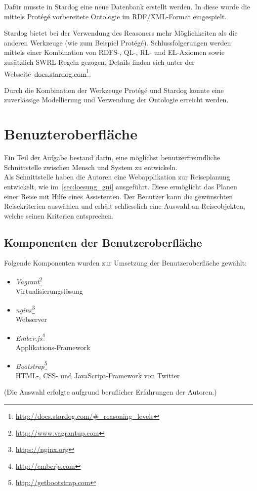 Dafür musste in Stardog eine neue Datenbank erstellt werden. In diese wurde die mittels Protégé vorbereitete Ontologie im RDF/XML-Format eingespielt.

Stardog bietet bei der Verwendung des Reasoners mehr Möglichkeiten als die anderen Werkzeuge (wie zum Beispiel Protégé). Schlussfolgerungen werden mittels einer Kombination von RDFS-, QL-, RL- und EL-Axiomen sowie zusätzlich SWRL-Regeln gezogen. Details finden sich unter der Webseite~\href{http://docs.stardog.com/\#_reasoning_levels}{docs.stardog.com}\footnote{\url{http://docs.stardog.com/\#_reasoning_levels}}.

Durch die Kombination der Werkzeuge Protégé und Stardog konnte eine zuverlässige Modellierung und Verwendung der Ontologie erreicht werden.

\section{Benuzteroberfläche}
\label{sec:komponenten:ember}
Ein Teil der Aufgabe bestand darin, eine möglichst benutzerfreundliche Schnittstelle zwischen Mensch und System zu entwickeln.\\
Als Schnittstelle haben die Autoren eine Webapplikation zur Reiseplanung entwickelt, wie im~\autoref{sec:loesung_gui} ausgeführt. Diese ermöglicht das Planen einer Reise mit Hilfe eines Assistenten. Der Benutzer kann die gewünschten Reisekriterien auswählen und erhält schliesslich eine Auswahl an Reiseobjekten, welche seinen Kriterien entsprechen.

\subsection{Komponenten der Benutzeroberfläche}
\label{subsec:komponenten:gui:komponenten}
Folgende Komponenten wurden zur Umsetzung der Benutzeroberfläche gewählt:
\begin{itemize}
    \item \textit{Vagrant}\footnote{\url{http://www.vagrantup.com}}\\
        Virtualisierungslösung
    \item \textit{nginx}\footnote{\url{https://nginx.org}}\\
        Webserver
    \item \textit{Ember.js}\footnote{\url{http://emberjs.com}}\\
        Applikations-Framework
    \item \textit{Bootstrap}\footnote{\url{http://getbootstrap.com}}\\
        HTML-, CSS- und JavaScript-Framework von Twitter
\end{itemize}
(Die Auswahl erfolgte aufgrund beruflicher Erfahrungen der Autoren.)

